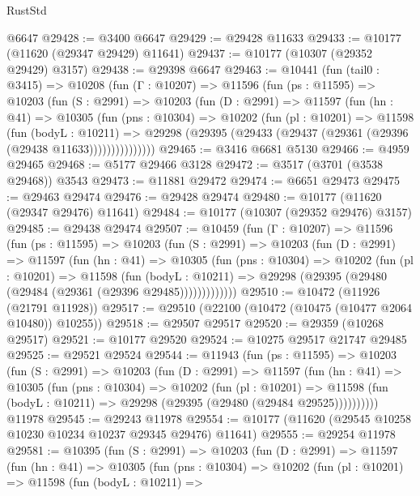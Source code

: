 \begin{lexlean}{RustStd}
\begin{coremodule}
    @6647
@29428 := @3400 @6647
@29429 := @29428 @11633
@29433 := @10177 (@11620 (@29347 @29429) @11641)
@29437 := @10177 (@10307 (@29352 @29429) @3157)
@29438 := @29398 @6647
@29463 := @10441
    (fun (tail0 : @3415) =>
    @10208
      (fun (Γ : @10207) =>
      @11596
        (fun (ps : @11595) =>
        @10203
          (fun (S : @2991) =>
          @10203
            (fun (D : @2991) =>
            @11597
              (fun (hn : @41) =>
              @10305
                (fun (pns : @10304) =>
                @10202
                  (fun (pl : @10201) =>
                  @11598
                    (fun (bodyL : @10211) =>
                    @29298 (@29395 (@29433 (@29437 (@29361 (@29396 (@29438 @11633)))))))))))))))
@29465 := @3416 @6681 @5130
@29466 := @4959 @29465
@29468 := @5177 @29466 @3128
@29472 := @3517 (@3701 (@3538 @29468)) @3543
@29473 := @11881 @29472
@29474 := @6651 @29473
@29475 := @29463 @29474
@29476 := @29428 @29474
@29480 := @10177 (@11620 (@29347 @29476) @11641)
@29484 := @10177 (@10307 (@29352 @29476) @3157)
@29485 := @29438 @29474
@29507 := @10459
    (fun (Γ : @10207) =>
    @11596
      (fun (ps : @11595) =>
      @10203
        (fun (S : @2991) =>
        @10203
          (fun (D : @2991) =>
          @11597
            (fun (hn : @41) =>
            @10305
              (fun (pns : @10304) =>
              @10202
                (fun (pl : @10201) =>
                @11598
                  (fun (bodyL : @10211) =>
                  @29298 (@29395 (@29480 (@29484 (@29361 (@29396 @29485)))))))))))))
@29510 := @10472 (@11926 (@21791 @11928))
@29517 := @29510 (@22100 (@10472 (@10475 (@10477 @2064 @10480)) @10255))
@29518 := @29507 @29517
@29520 := @29359 (@10268 @29517)
@29521 := @10177 @29520
@29524 := @10275 @29517 @21747 @29485
@29525 := @29521 @29524
@29544 := @11943
    (fun (ps : @11595) =>
    @10203
      (fun (S : @2991) =>
      @10203
        (fun (D : @2991) =>
        @11597
          (fun (hn : @41) =>
          @10305
            (fun (pns : @10304) =>
            @10202
              (fun (pl : @10201) =>
              @11598 (fun (bodyL : @10211) => @29298 (@29395 (@29480 (@29484 @29525))))))))))
    @11978
@29545 := @29243 @11978
@29554 := @10177 (@11620 (@29545 @10258 @10230 @10234 @10237 @29345 @29476) @11641)
@29555 := @29254 @11978
@29581 := @10395
    (fun (S : @2991) =>
    @10203
      (fun (D : @2991) =>
      @11597
        (fun (hn : @41) =>
        @10305
          (fun (pns : @10304) =>
          @10202
            (fun (pl : @10201) =>
            @11598
              (fun (bodyL : @10211) =>

\end{coremodule}
\end{lexlean}
